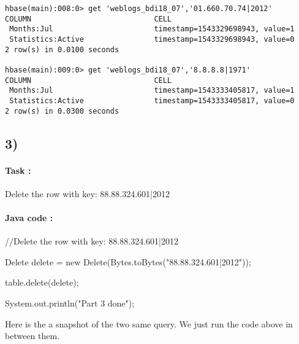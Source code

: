 \documentclass[a4paper,11pt]{report}
\begin{document}
\begin{verbatim}
hbase(main):008:0> get 'weblogs_bdi18_07','01.660.70.74|2012'
COLUMN                            CELL                                                                                          
 Months:Jul                       timestamp=1543329698943, value=1                                                              
 Statistics:Active                timestamp=1543329698943, value=0                                                              
2 row(s) in 0.0100 seconds

hbase(main):009:0> get 'weblogs_bdi18_07','8.8.8.8|1971'
COLUMN                            CELL                                                                                          
 Months:Jul                       timestamp=1543333405817, value=1                                                              
 Statistics:Active                timestamp=1543333405817, value=0                                                              
2 row(s) in 0.0300 seconds
\end{verbatim}

\subsection*{3)}

\paragraph{Task : } Delete the row with key: 88.88.324.601|2012

\paragraph{Java code : }

\begin{javacode}
//Delete the row with key: 88.88.324.601|2012

Delete delete = new Delete(Bytes.toBytes("88.88.324.601|2012"));

table.delete(delete);

System.out.println("Part 3 done");
\end{javacode}

Here is the a snapshot of the two same query. We just run the code above in
between them.
\end{document}
